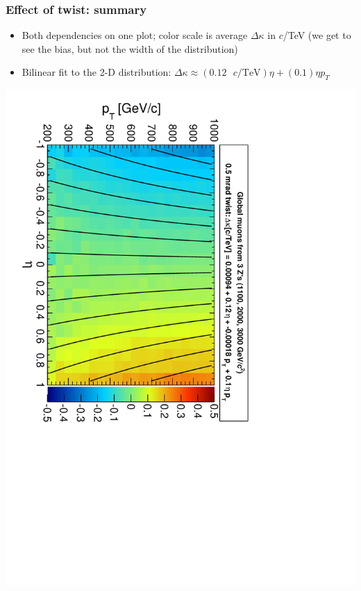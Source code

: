 \documentclass[compress]{beamer}
\begin{document}
\begin{frame}
\frametitle{Effect of twist: summary}
\begin{itemize}
\item Both dependencies on one plot; color scale is average $\Delta\kappa$ in $c$/TeV (we get to see the bias, but not the width of the distribution)
\item Bilinear fit to the 2-D distribution: $\Delta\kappa \approx (0.12\mbox{ $c$/TeV})\eta + (0.1)\eta p_T$
\end{itemize}
\begin{center}
\includegraphics[height=0.9\linewidth, angle=90]{trackdistort2d_twist0_5mrad_GlobalMuons2.pdf}
\end{center}
\label{page:summary}
\end{frame}
\end{document}
